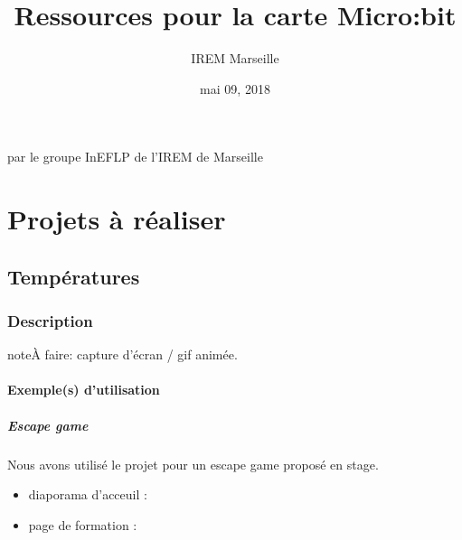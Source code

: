 \documentclass[letterpaper,10pt,french]{sphinxmanual}
\title{Ressources pour la carte Micro:bit}
\date{mai 09, 2018}
\author{IREM Marseille}
\begin{document}
\maketitle
\sphinxtableofcontents
{}\label{\detokenize{index::doc}}


par le groupe InEFLP de l’IREM de Marseille


\chapter{Projets à réaliser}
\label{\detokenize{index:documentation-micro-bit}}\label{\detokenize{index:projets-a-realiser}}

\section{Températures}
\label{\detokenize{projets/temperature:projettemp}}\label{\detokenize{projets/temperature::doc}}\label{\detokenize{projets/temperature:temperatures}}

\subsection{Description}
\label{\detokenize{projets/temperature:description}}
\begin{sphinxadmonition}{note}{\label{projets/temperature:index-0}À faire:}
capture d’écran / gif animée.
\end{sphinxadmonition}


\subsubsection{Exemple(s) d’utilisation}
\label{\detokenize{projets/temperature:exemple-s-d-utilisation}}

\paragraph{Escape game}
\label{\detokenize{projets/temperature-exemple-escape:projettempescape}}\label{\detokenize{projets/temperature-exemple-escape:escape-game}}\label{\detokenize{projets/temperature-exemple-escape::doc}}
Nous avons utilisé le projet {\hyperref[\detokenize{projets/temperature:projettemp}]{}} pour un escape game proposé en stage.
\begin{itemize}
\item {} 
diaporama d’acceuil : 

\item {} 
page de formation : 

\end{itemize}
\end{document}
